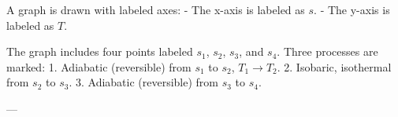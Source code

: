 A graph is drawn with labeled axes:  
- The x-axis is labeled as \( s \).  
- The y-axis is labeled as \( T \).  

The graph includes four points labeled \( s_1 \), \( s_2 \), \( s_3 \), and \( s_4 \).  
Three processes are marked:  
1. Adiabatic (reversible) from \( s_1 \) to \( s_2 \), \( T_1 \rightarrow T_2 \).  
2. Isobaric, isothermal from \( s_2 \) to \( s_3 \).  
3. Adiabatic (reversible) from \( s_3 \) to \( s_4 \).  

---